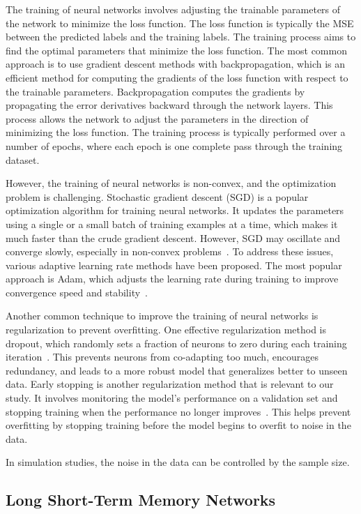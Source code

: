 The training of neural networks involves adjusting the trainable parameters of the network to minimize the loss function.
The loss function is typically the MSE between the predicted labels and the training labels.
The training process aims to find the optimal parameters that minimize the loss function.
The most common approach is to use gradient descent methods with backpropagation, which is an efficient method for computing the gradients of the loss function with respect to the trainable parameters.
Backpropagation computes the gradients by propagating the error derivatives backward through the network layers.
This process allows the network to adjust the parameters in the direction of minimizing the loss function.
The training process is typically performed over a number of epochs, where each epoch is one complete pass through the training dataset.

However, the training of neural networks is non-convex, and the optimization problem is challenging.
Stochastic gradient descent (SGD) is a popular optimization algorithm for training neural networks.
It updates the parameters using a single or a small batch of training examples at a time, which makes it much faster than the crude gradient descent.
However, SGD may oscillate and converge slowly, especially in non-convex problems~\citep{bengio2016}.
To address these issues, various adaptive learning rate methods have been proposed.
The most popular approach is Adam, which adjusts the learning rate during training to improve convergence speed and stability~\citep{kingma2014adam}.

Another common technique to improve the training of neural networks is regularization to prevent overfitting.
One effective regularization method is dropout, which randomly sets a fraction of neurons to zero during each training iteration~\citep{srivastava2014dropout}.
This prevents neurons from co-adapting too much, encourages redundancy, and leads to a more robust model that generalizes better to unseen data.
Early stopping is another regularization method that is relevant to our study.
It involves monitoring the model's performance on a validation set and stopping training when the performance no longer improves~\citep{prechelt2002early}.
This helps prevent overfitting by stopping training before the model begins to overfit to noise in the data.

In simulation studies, the noise in the data can be controlled by the sample size.

\subsection{Long Short-Term Memory Networks}

